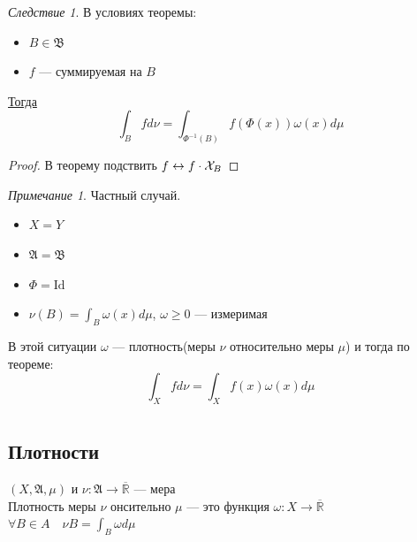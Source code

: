 \documentclass[oneside]{book}
\newcommand{\R}{\mathbb{R}}
\newcommand{\A}{\mathfrak{A}}
\newcommand{\B}{\mathfrak{B}}
\theoremstyle{plain}
\theoremstyle{remark}
\newtheorem*{remark}{Примечание}
\newtheorem{corollary}{Следствие}[theorem]
\theoremstyle{definition}
\begin{document}
\begin{corollary}
В условиях теоремы:
\begin{itemize}
\item \(B \in \B\)
\item \(f\) --- суммируемая на \(B\)
\end{itemize}
\uline{Тогда} \[ \int_B f d\nu = \int_{\Phi^{-1}(B)}f(\Phi(x))\omega(x)d\mu\]
\end{corollary}
\begin{proof}
В теорему подствить \(f \leftrightarrow f\cdot\X_{B}\)
\end{proof}
\begin{remark}
Частный случай.
\begin{itemize}
\item \(X = Y\)
\item \(\A = \B\)
\item \(\Phi = \text{Id}\)
\item \(\nu(B) = \int_B\omega(x)d\mu\), \(\omega \ge 0\) --- измеримая
\end{itemize}
В этой ситуации \(\omega\) --- плотность(меры \(\nu\) относительно меры \(\mu\)) и тогда по теореме:
\[ \int_X f d\nu = \int_X f(x)\omega(x)d\mu \]
\end{remark}
\chapter{}
\label{sec:orgb47a679}
\newcommand{\X}{\mathcal{X}}
\newcommand{\A}{\mathfrak{A}}
\newcommand{\B}{\mathfrak{B}}
\newcommand{\M}{\mathfrak{M}}

\section{Плотности}
\label{sec:orgbf52263}

 \((X, \A, \mu)\) и \(\nu: \A \to \overline{\R}\) --- мера \\
Плотность  меры \(\nu\) онсительно \(\mu\) --- это функция \(\omega: X \to \overline{\R}\) \\
\(\forall B \in A\quad \nu B = \int_B \omega d\mu\)
\end{document}
